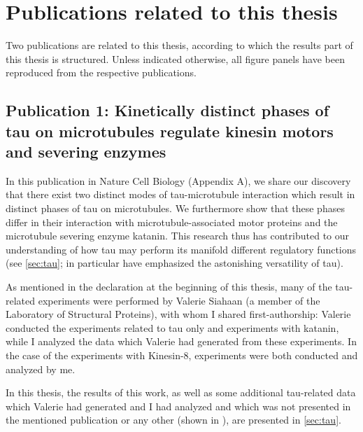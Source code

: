 \chapter{Publications related to this thesis}
\label{chap:publications}
Two publications are related to this thesis, according to which the results part of this thesis is structured. Unless indicated otherwise, all figure panels have been reproduced from the respective publications.

\section{Publication 1: Kinetically distinct phases of tau on microtubules regulate kinesin motors and severing enzymes}
In this publication in Nature Cell Biology \parencite{Siahaan2019a} (Appendix A), we share our discovery that there exist two distinct modes of tau-microtubule interaction which result in distinct phases of tau on microtubules. We furthermore show that these phases differ in their interaction with microtubule-associated motor proteins and the microtubule severing enzyme katanin. This research thus has contributed to our understanding of how tau may perform its manifold different regulatory functions (see \autoref{sec:tau}; \cite{Morris2011b} in particular have emphasized the astonishing versatility of tau). \par

As mentioned in the declaration at the beginning of this thesis, many of the tau-related experiments were performed by Valerie Siahaan (a member of the Laboratory of Structural Proteins), with whom I shared first-authorship: Valerie conducted the experiments related to tau only and experiments with katanin, while I analyzed the data which Valerie had generated from these experiments. In the case of the experiments with Kinesin-8, experiments were both conducted and analyzed by me. \par

In this thesis, the results of this work, as well as some additional tau-related data which Valerie had generated and I had analyzed and which was not presented in the mentioned publication or any other (shown in ), are presented in \autoref{sec:tau}. 


